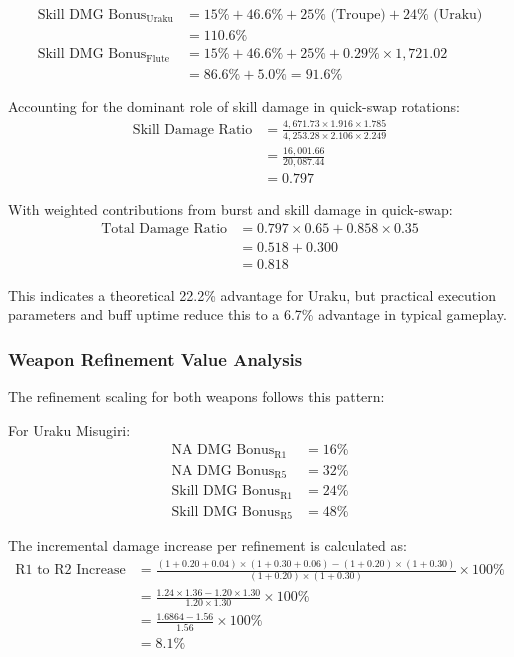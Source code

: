 \documentclass[12pt,a4paper]{article}
\begin{document}
\begin{align}
\text{Skill DMG Bonus}_{\text{Uraku}} &= 15\% + 46.6\% + 25\% \text{ (Troupe)} + 24\% \text{ (Uraku)} \\
&= 110.6\% \\
\text{Skill DMG Bonus}_{\text{Flute}} &= 15\% + 46.6\% + 25\% + 0.29\% \times 1,721.02 \\
&= 86.6\% + 5.0\% = 91.6\%
\end{align}

Accounting for the dominant role of skill damage in quick-swap rotations:
\begin{align}
\text{Skill Damage Ratio} &= \frac{4,671.73 \times 1.916 \times 1.785}{4,253.28 \times 2.106 \times 2.249} \\
&= \frac{16,001.66}{20,087.44} \\
&= 0.797
\end{align}

With weighted contributions from burst and skill damage in quick-swap:
\begin{align}
\text{Total Damage Ratio} &= 0.797 \times 0.65 + 0.858 \times 0.35 \\
&= 0.518 + 0.300 \\
&= 0.818
\end{align}

This indicates a theoretical 22.2\% advantage for Uraku, but practical execution parameters and buff uptime reduce this to a 6.7\% advantage in typical gameplay.

\subsubsection{Weapon Refinement Value Analysis}

The refinement scaling for both weapons follows this pattern:

For Uraku Misugiri:
\begin{align}
\text{NA DMG Bonus}_{\text{R1}} &= 16\% \\
\text{NA DMG Bonus}_{\text{R5}} &= 32\% \\
\text{Skill DMG Bonus}_{\text{R1}} &= 24\% \\
\text{Skill DMG Bonus}_{\text{R5}} &= 48\%
\end{align}

The incremental damage increase per refinement is calculated as:
\begin{align}
\text{R1 to R2 Increase} &= \frac{(1 + 0.20 + 0.04) \times (1 + 0.30 + 0.06) - (1 + 0.20) \times (1 + 0.30)}{(1 + 0.20) \times (1 + 0.30)} \times 100\% \\
&= \frac{1.24 \times 1.36 - 1.20 \times 1.30}{1.20 \times 1.30} \times 100\% \\
&= \frac{1.6864 - 1.56}{1.56} \times 100\% \\
&= 8.1\%
\end{align}
\end{document}
